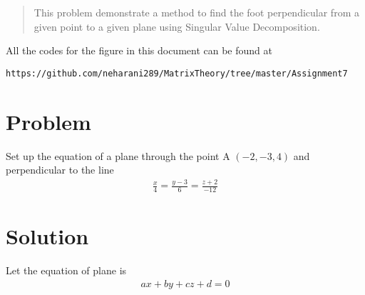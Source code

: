 \documentclass[journal,12pt,twocolumn]{IEEEtran}
\begin{document}
	
	\maketitle
	\newpage
	\bigskip
	\renewcommand{\thefigure}{\theenumi}
	\renewcommand{\thetable}{\theenumi}
	\date{Today}
	
\begin{abstract}
This problem demonstrate a method to  find the foot perpendicular  from a given point to a given plane using Singular Value Decomposition.
\end{abstract}
All the codes for the figure in this document can be found at
\begin{lstlisting}
https://github.com/neharani289/MatrixTheory/tree/master/Assignment7
\end{lstlisting}
\section{\textbf{Problem}}
Set up the equation of a plane through the point A $\left(-2, -3, 4 \right)$ and perpendicular to the line 
\begin{align}
\frac{x}{4} = \frac{y - 3}{6} = \frac{z+2}{-12} \label{eq1.1}
\end{align}
 \section{\textbf{Solution}} 
 Let the equation of plane is 
 \begin{align}
 ax +by +cz +d = 0 \label{eq2.1}
 \end{align}
 
\end{document}
